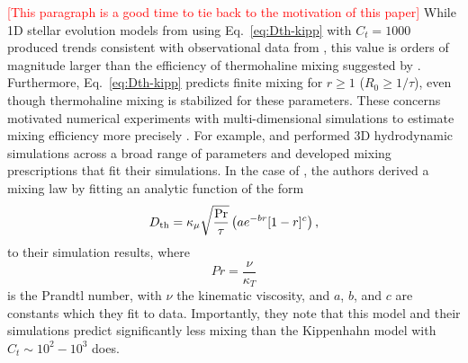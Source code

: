 \textcolor{red}{[This paragraph is a good time to tie back to the motivation of this paper]} 
While 1D stellar evolution models from \citet{charbonnel_thermohaline_2007} using Eq.~\eqref{eq:Dth-kipp} with $C_t = 1000$ produced trends consistent with observational data from \citet{Gratton2000}, this value is orders of magnitude larger than the efficiency of thermohaline mixing suggested by \citet{kippenhahn_etal_1980}. 
Furthermore, Eq.~\eqref{eq:Dth-kipp} predicts finite mixing for $r \geq 1$ ($R_0 \geq 1/\tau$), even though thermohaline mixing is stabilized for these parameters. 
These concerns motivated numerical experiments with multi-dimensional simulations to estimate mixing efficiency more precisely \citep{Denissenkov2010thermohaline,traxler_etal_2011}. 
For example, \citet{traxler_etal_2011} and \citet{brown_etal_2013} performed 3D hydrodynamic simulations across a broad range of parameters and developed mixing prescriptions that fit their simulations. 
In the case of \citet{traxler_etal_2011}, the authors derived a mixing law by fitting an
analytic function 
of the form
\begin{equation} \label{eqn:trax_model}
   \Dth = \kappa_{\mu}\sqrt{\frac{\mathrm{Pr}}{\tau}}\left(a e^{-br}[1 - r]^c\right),
\end{equation}
to their simulation results,
where 
\begin{equation} \label{eq:Prandtl}
    Pr = \frac{\nu}{\kappa_T}
\end{equation}
is the Prandtl number, with $\nu$ the kinematic viscosity,
%
and $a$, $b$, and $c$ are constants which they fit to data. 
Importantly, they note that this model and their simulations predict significantly less mixing than the Kippenhahn model with $C_t \sim 10^2 - 10^3$ does.

